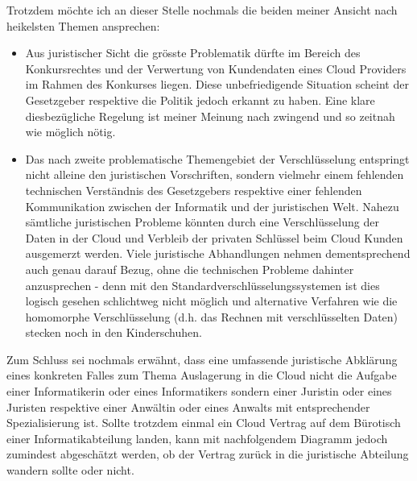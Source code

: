 \documentclass[a4paper,pointlessnumbers]{scrreprt}
\begin{document}
Trotzdem möchte ich an dieser Stelle nochmals die beiden meiner Ansicht nach heikelsten Themen ansprechen:
\begin{itemize}[itemsep=0pt]
\item Aus juristischer Sicht die grösste Problematik dürfte im Bereich des Konkursrechtes und der Verwertung von Kundendaten eines Cloud Providers im Rahmen des Konkurses liegen. Diese unbefriedigende Situation scheint der Gesetzgeber respektive die Politik jedoch erkannt zu haben. Eine klare diesbezügliche Regelung ist meiner Meinung nach zwingend und so zeitnah wie möglich nötig.
\item Das nach zweite problematische Themengebiet der Verschlüsselung entspringt nicht alleine den juristischen Vorschriften, sondern vielmehr einem fehlenden technischen Verständnis des Gesetzgebers respektive einer fehlenden Kommunikation zwischen der Informatik und der juristischen Welt. Nahezu sämtliche juristischen Probleme könnten durch eine Verschlüsselung der Daten in der Cloud und Verbleib der privaten Schlüssel beim Cloud Kunden ausgemerzt werden. Viele juristische Abhandlungen nehmen dementsprechend auch genau darauf Bezug, ohne die technischen Probleme dahinter anzusprechen - denn mit den Standardverschlüsselungssystemen ist dies logisch gesehen schlichtweg nicht möglich und alternative Verfahren wie die homomorphe Verschlüsselung (d.h. das Rechnen mit verschlüsselten Daten) stecken noch in den Kinderschuhen.
\end{itemize}

Zum Schluss sei nochmals erwähnt, dass eine umfassende juristische Abklärung eines konkreten Falles zum Thema Auslagerung in die Cloud nicht die Aufgabe einer Informatikerin oder eines Informatikers sondern einer Juristin oder eines Juristen respektive einer Anwältin oder eines Anwalts mit entsprechender Spezialisierung ist. Sollte trotzdem einmal ein Cloud Vertrag auf dem Bürotisch einer Informatikabteilung landen, kann mit nachfolgendem Diagramm jedoch zumindest abgeschätzt werden, ob der Vertrag zurück in die juristische Abteilung wandern sollte oder nicht.
\end{document}
